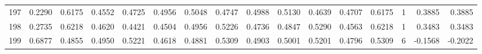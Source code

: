 \begin{tabular}{lrrrrrrrrrrrrrrr}
197 &      0.2290 &  0.6175 &  0.4552 &  0.4725 &  0.4956 &  0.5048 &  0.4747 &  0.4988 &  0.5130 &  0.4639 &   0.4707 &     0.6175 &      1 &                    0.3885 &                     0.3885 \\
198 &      0.2735 &  0.6218 &  0.4620 &  0.4421 &  0.4504 &  0.4956 &  0.5226 &  0.4736 &  0.4847 &  0.5290 &   0.4563 &     0.6218 &      1 &                    0.3483 &                     0.3483 \\
199 &      0.6877 &  0.4855 &  0.4950 &  0.5221 &  0.4618 &  0.4881 &  0.5309 &  0.4903 &  0.5001 &  0.5201 &   0.4796 &     0.5309 &      6 &                   -0.1568 &                    -0.2022 \\
\bottomrule
\end{tabular}
